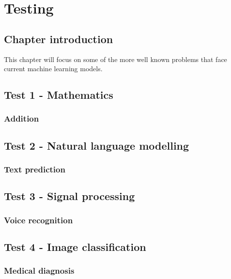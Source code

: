 \chapter{Testing}
\section{Chapter introduction}
This chapter will focus on some of the more well known problems that face current machine learning models. 
\section{Test 1 - Mathematics}
\subsection{Addition}
\section{Test 2 - Natural language modelling}
\subsection{Text prediction}
\section{Test 3 - Signal processing}
\subsection{Voice recognition}
\section{Test 4 - Image classification}
\subsection{Medical diagnosis}
